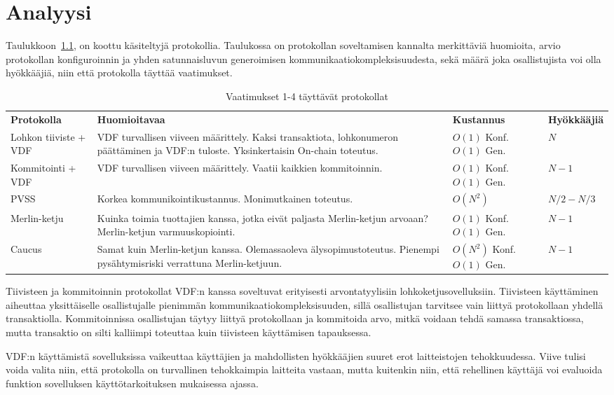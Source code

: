\chapter{Analyysi\label{discussion}}



Taulukkoon~\ref{table:results}, on koottu käsiteltyjä protokollia. Taulukossa on protokollan soveltamisen kannalta merkittäviä huomioita, arvio protokollan konfiguroinnin ja yhden satunnaisluvun generoimisen kommunikaatiokompleksisuudesta, sekä määrä joka osallistujista voi olla hyökkääjiä, niin että protokolla täyttää vaatimukset.

\begin{table}[h]
    \caption{Vaatimukset 1-4 täyttävät protokollat}
    \label{table:results}
    \begin{tabular}{  l  p{5cm}  p{4cm} p{2cm} }
        \toprule
\textbf{Protokolla}      
& \textbf{Huomioitavaa}
& \textbf{Kustannus}
& \textbf{Hyökkääjiä} \\
Lohkon tiiviste + VDF 
& VDF turvallisen viiveen määrittely. Kaksi transaktiota, lohkonumeron päättäminen ja VDF:n tuloste. Yksinkertaisin On-chain toteutus.
& $O(1)$ Konf. $O(1)$ Gen.
& $N$ \\\hline
Kommitointi + VDF       
& VDF turvallisen viiveen määrittely. Vaatii kaikkien kommitoinnin.                   
&  $O(1)$ Konf. $O(1)$ Gen.
& $N-1$  \\\hline
PVSS        
& Korkea kommunikointikustannus. Monimutkainen toteutus.
& $O(N^2)$
& $N/2 - N/3$  \\\hline
Merlin-ketju
& Kuinka toimia tuottajien kanssa, jotka eivät paljasta Merlin-ketjun arvoaan? Merlin-ketjun varmuuskopiointi.
& $O(1)$ Konf. $O(1)$ Gen. 
& $N-1$ \\\hline
Caucus
& Samat kuin Merlin-ketjun kanssa. Olemassaoleva älysopimustoteutus. Pienempi pysähtymisriski verrattuna Merlin-ketjuun.
& $O(N^2)$ Konf. $O(1)$ Gen. 
& $N-1$ \\\hline
        \bottomrule
    \end{tabular}
\end{table}

Tiivisteen ja kommitoinnin protokollat VDF:n kanssa soveltuvat erityisesti arvontatyylisiin lohkoketjusovelluksiin. Tiivisteen käyttäminen aiheuttaa yksittäiselle osallistujalle pienimmän kommunikaatiokompleksisuuden, sillä osallistujan tarvitsee vain liittyä protokollaan yhdellä transaktiolla. Kommitoinnissa osallistujan täytyy liittyä protokollaan ja kommitoida arvo, mitkä voidaan tehdä samassa transaktiossa, mutta transaktio on silti kalliimpi toteuttaa kuin tiivisteen käyttämisen tapauksessa.

VDF:n käyttämistä sovelluksissa vaikeuttaa käyttäjien ja mahdollisten hyökkääjien suuret erot laitteistojen tehokkuudessa. Viive tulisi voida valita niin, että protokolla on turvallinen tehokkaimpia laitteita vastaan, mutta kuitenkin niin, että rehellinen käyttäjä voi evaluoida funktion sovelluksen käyttötarkoituksen mukaisessa ajassa.